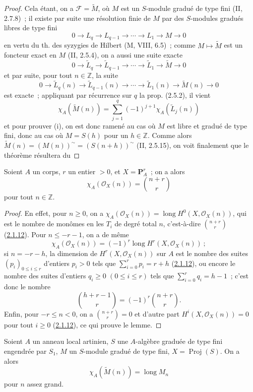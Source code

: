 \begin{proof}
Cela étant, on a $\mathcal F=\widetilde M$, où $M$ est un $S$-module
gradué de type fini (II, 2.7.8)~; il existe par suite une résolution finie
de $M$ par des $S$-modules gradués libres de type fini
\[
0\to L_q\to L_{q-1}\to\cdots\to L_1\to M\to0
\]
en vertu du th. des syzygies de Hilbert (M, VIII, 6.5)~; comme
$M\mapsto\widetilde M$ est un foncteur exact en $M$ (II, 2.5.4), on a
aussi une suite exacte
\[
0\to\widetilde L_q\to\widetilde L_{q-1}\to\cdots
\to\widetilde L_1\to\widetilde M\to0
\]
et par suite, pour tout $n\in\mathbb Z$, la suite
\[
0\to\widetilde L_q(n)\to\widetilde L_{q-1}(n)\to\cdots
\to\widetilde L_1(n)\to\widetilde M(n)\to0
\]
est exacte~; appliquant par récurrence sur $q$ la prop. (2.5.2), il vient
\[
\chi_A(\widetilde M(n))=\sum_{j=1}^{q}(-1)^{j+1}
\chi_A(\widetilde L_j(n))
\]
et pour prouver (i), on est donc ramené au cas où $M$ est libre et gradué
de type fini, donc au cas où $M=S(h)$ pour un $h\in\mathbb Z$. Comme
alors $\widetilde M(n)=(M(n))^\sim=(S(n+h))^\sim$ (II, 2.5.15), on voit
finalement que le théorème résultera du
\end{proof}

\begin{lemma}[2.5.3.1]
\label{III.2.5.3.1-fr}
Soient $A$ un corps, $r$ un entier $>0$, et $X=\mathbf P_A^r$~; on a
alors
\[
\chi_A(\mathcal O_X(n))=\binom{n+r}{r}
\]
pour tout $n\in\mathbb Z$.
\end{lemma}

\begin{proof}
En effet, pour $n\geq0$, on a
$\chi_A(\mathcal O_X(n))=\operatorname{long}H^0(X,\mathcal O_X(n))$, qui
est le nombre de monômes en les $T_i$ de degré total $n$, c'est-à-dire
$\binom{n+r}{r}$ (\hyperref[III.2.1.12-fr]{2.1.12}). Pour
$n\leq-r-1$, on a de même
\[
\chi_A(\mathcal O_X(n))=(-1)^r
\operatorname{long}H^r(X,\mathcal O_X(n))~;
\]
si $n=-r-h$, la dimension de $H^r(X,\mathcal O_X(n))$ sur $A$ est le
nombre des suites $(p_i)_{0\leq i\leq r}$ d'entiers $p_i>0$ tels que
$\sum_{i=0}^{r}p_i=r+h$ (\hyperref[III.2.1.12-fr]{2.1.12}), ou encore le
nombre des suites d'entiers $q_i\geq0$ $(0\leq i\leq r)$ tels que
$\sum_{i=0}^{r}q_i=h-1$~; c'est donc le nombre
\[
\binom{h+r-1}{r}=(-1)^r\binom{n+r}{r}.
\]
Enfin, pour $-r\leq n<0$, on a $\binom{n+r}{r}=0$ et d'autre part
$H^i(X,\mathcal O_X(n))=0$ pour tout $i\geq0$
(\hyperref[III.2.1.12-fr]{2.1.12}), ce qui prouve le lemme.
\end{proof}

\begin{corollary}[2.5.4]
\label{III.2.5.4-fr}
Soient $A$ un anneau local artinien, $S$ une $A$-algèbre graduée de type
fini engendrée par $S_1$, $M$ un $S$-module gradué de type fini,
$X=\operatorname{Proj}(S)$. On a alors
\[
\chi_A(\widetilde M(n))=\operatorname{long}M_n
\]
pour $n$ assez grand.
\end{corollary}

